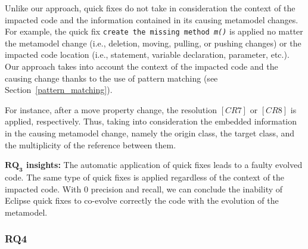 	
	Unlike our approach, quick fixes do not take in consideration the context of the impacted code and the information contained in its causing metamodel changes. For example, the quick fix \texttt{create the missing method \emph{m()}} is applied no matter the metamodel change (i.e., deletion, moving, pulling, or pushing changes) or the impacted code location (i.e., statement, variable declaration, parameter, etc.). %
	Our approach takes into account the context of the impacted code and the causing change thanks to the use of pattern matching (see Section~\ref{pattern_matching}). 
	
	
	For instance, after a move property change, the resolution $[CR7]$ or $[CR8]$ is applied, respectively. Thus, taking into consideration the embedded information in the causing metamodel change, namely the origin class, the target class, and the multiplicity of the reference between them.
	
	
	
	\begin{tcolorbox}[boxsep=-2pt]
	\textbf{$\boldsymbol{RQ_3}$ insights:}
	The automatic application of quick fixes leads to a faulty evolved code. The same type of quick fixes is applied regardless of the context of the impacted code. With 0 precision and recall, we can conclude the inability of Eclipse quick fixes to co-evolve correctly the code with the evolution of the metamodel. 
	\red{}
	
	\end{tcolorbox}
	
	
	
	\subsubsection{RQ4}
	
